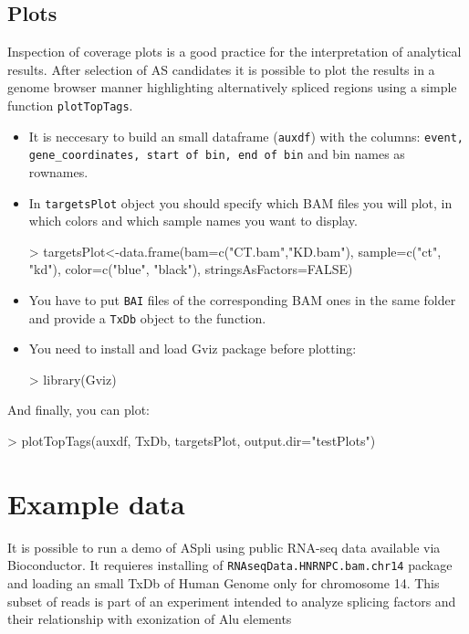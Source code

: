 \documentclass{article}
\begin{document}
\subsection{Plots}
Inspection of coverage plots is a good practice for the interpretation of analytical results. After selection of AS candidates it is possible to plot the results in a genome browser manner highlighting  alternatively spliced regions using a simple function \texttt{plotTopTags}.
\begin{itemize}
\item It is neccesary to build an small dataframe (\texttt{auxdf}) with the columns:
\texttt{event, gene\_coordinates, start of bin, end of bin} and bin names as rownames.
\item In \texttt{targetsPlot} object you should specify which BAM files you will plot, in which colors and which sample names you want to display. 

\begin{Schunk}
\begin{Sinput}
> targetsPlot<-data.frame(bam=c("CT.bam","KD.bam"), 
                         sample=c("ct", "kd"), 
                         color=c("blue", "black"), 
                         stringsAsFactors=FALSE)
\end{Sinput}
\end{Schunk}
\item You have to put \texttt{BAI} files of the corresponding BAM ones in the same folder and provide a \texttt{TxDb} object to the function. 

\item You need  to install and load Gviz package before plotting:

\begin{Schunk}
\begin{Sinput}
> library(Gviz)
\end{Sinput}
\end{Schunk}

\end{itemize}
And finally, you can plot:

\begin{Schunk}
\begin{Sinput}
> plotTopTags(auxdf, 
             TxDb, 
             targetsPlot, 
             output.dir="testPlots")
\end{Sinput}
\end{Schunk}

\section{Example data}
It is possible to run a demo of ASpli using public RNA-seq data available via Bioconductor. It requieres installing of \texttt{RNAseqData.HNRNPC.bam.chr14} package and loading  an small TxDb of Human Genome only for chromosome 14. This subset of reads is part of an experiment intended to analyze splicing factors and their relationship with exonization of Alu elements \cite{Zarnack2013453} 
\end{document}
